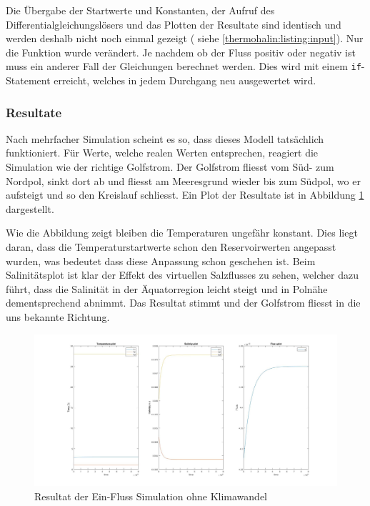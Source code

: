 Die Übergabe der Startwerte und Konstanten, der Aufruf des Differentialgleichungslösers und das Plotten der Resultate sind identisch und werden deshalb nicht noch einmal gezeigt ( siehe  \ref{thermohalin:listing:input}). Nur die Funktion wurde verändert. Je nachdem ob der Fluss positiv oder negativ ist muss ein anderer Fall der Gleichungen berechnet werden. Dies wird mit einem \texttt{if}-Statement erreicht, welches in jedem Durchgang neu ausgewertet wird. 




\subsubsection{Resultate} 

Nach mehrfacher Simulation scheint es so, dass dieses Modell tatsächlich funktioniert. Für Werte, welche realen Werten entsprechen, reagiert die Simulation wie der richtige Golfstrom. Der Golfstrom fliesst vom Süd- zum Nordpol, sinkt dort ab und fliesst am Meeresgrund wieder bis zum Südpol, wo er aufsteigt und so den Kreislauf schliesst. Ein Plot der Resultate ist in Abbildung \ref{thermohalin:3b1f-skript} dargestellt.

Wie die Abbildung zeigt bleiben die Temperaturen ungefähr konstant. Dies liegt daran, dass die Temperaturstartwerte schon den Reservoirwerten angepasst wurden, was bedeutet dass diese Anpassung schon geschehen ist. Beim Salinitätsplot ist klar der Effekt des virtuellen Salzflusses zu sehen, welcher dazu führt, dass die Salinität in der Äquatorregion leicht steigt und in Polnähe dementsprechend abnimmt. Das Resultat stimmt und der Golfstrom fliesst in die uns bekannte Richtung.

\begin{figure}
	\centering
	\includegraphics[width=14cm]{thermohalin/Code/graphs/3b1f-skript.jpg}
	\caption{Resultat der Ein-Fluss Simulation ohne Klimawandel}
	\label{thermohalin:3b1f-skript}
\end{figure}

